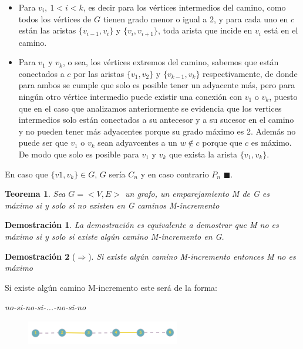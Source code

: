 \documentclass[a4paper,1pt]{report}
\newtheorem*{teo}{Teorema}
\newtheorem*{dem}{Demostración}
\begin{document}
\begin{itemize}
    \item[] Para $v_i, \ 1<i< k$, es decir para los v\'ertices intermedios del camino, como todos los v\'ertices de $G$ tienen grado menor o igual a 2, y para cada uno en $c$ est\'an las aristas $\{v_{i-1}, v_i\}$ y $\{v_i, v_{i+1}\}$, toda arista que incide en $v_i$ est\'a en el camino.
    \item[] Para $v_1$ y $v_k$, o sea, los v\'ertices extremos del camino, sabemos que est\'an conectados a $c$ por las aristas $\{v_1, v_2\}$ y $\{v_{k-1}, v_k\}$ respectivamente, de donde para ambos se cumple que solo es posible tener un adyacente m\'as, pero para ning\'un otro v\'ertice intermedio puede existir una conexi\'on con $v_1$ o $v_k$, puesto que en el caso que analizamos anteriormente se evidencia que los vertices intermedios solo est\'an conectados a su antecesor y a su sucesor en el camino y no pueden tener m\'as adyacentes porque su grado m\'aximo es 2. Adem\'as no puede ser que $v_1$ o $v_k$ sean adyavcentes a un $w \notin c$ porque que $c$ es m\'aximo. De modo que solo es posible para $v_1$ y $v_k$ que exista la arista $\{v_1, v_k\}$.
\end{itemize}

En caso que $\{v1, v_k\} \in G$, $G$ ser\'ia $C_n$ y en caso contrario $P_n$ $\blacksquare$.


\begin{teo}
 Sea $G=<V,E>$ un grafo, un emparejamiento M de G es máximo si y solo si no existen en G caminos M-incremento
\end{teo}


\begin{dem}
La demostración es equivalente a demostrar que M no es máximo si y solo si existe algún camino M-incremento en G. 
\end{dem}

\begin{dem}[$\Rightarrow$]
    Si existe algún camino M-incremento entonces M no es máximo
\end{dem}

Si existe algún camino M-incremento este será de la forma:

\textit{no-si-no-si-...-no-si-no}

\begin{figure}[H]
    \centering
    \includegraphics[width=0.6\textwidth]{figures7/mincremento.png}
\end{figure} 
\end{document}
